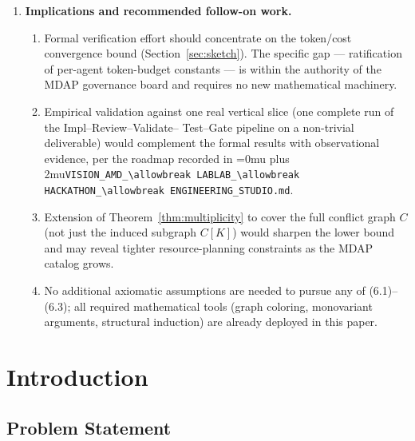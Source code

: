\documentclass[12pt]{article}
\theoremstyle{definition}
\DeclareRobustCommand{\code}[1]{\begingroup\Urlmuskip=0mu plus 2mu\relax\nolinkurl{#1}\endgroup}
\newcommand{\VisionHackathon}{\code{VISION\_AMD\_\allowbreak LABLAB\_\allowbreak HACKATHON\_\allowbreak ENGINEERING\_STUDIO.md}}
\begin{document}
\begin{enumerate}
    \item \textbf{Implications and recommended follow-on work.}
    \begin{enumerate}
        \item[(6.1)] Formal verification effort should concentrate on
              the token/cost convergence bound
              (Section~\ref{sec:sketch}).
              The specific gap --- ratification of per-agent
              token-budget constants --- is within the authority of
              the MDAP governance board and requires no new
              mathematical machinery.
        \item[(6.2)] Empirical validation against one real vertical
              slice (one complete run of the Impl--Review--Validate--
              Test--Gate pipeline on a non-trivial deliverable) would
              complement the formal results with observational
              evidence, per the roadmap recorded in \VisionHackathon{}.
        \item[(6.3)] Extension of Theorem~\ref{thm:multiplicity} to
              cover the full conflict graph $C$ (not just the induced
              subgraph $C[K]$) would sharpen the lower bound and may
              reveal tighter resource-planning constraints as the MDAP
              catalog grows.
        \item[(6.4)] No additional axiomatic assumptions are needed to
              pursue any of (6.1)--(6.3); all required mathematical
              tools (graph coloring, monovariant arguments, structural
              induction) are already deployed in this paper.
    \end{enumerate}

\end{enumerate}

\newpage
\tableofcontents
\newpage

\section{Introduction}
\label{sec:intro}

\subsection{Problem Statement}
\label{sec:intro:problem}
\end{document}
